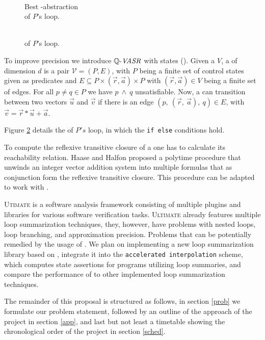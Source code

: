 \begin{minipage}[t]{0.35\linewidth} \centering
	\begin{figure}[H]
			
			\caption{\\ Best \qvasr-abstraction \\ of $P$'s loop.}
			\label{vasr}
	\end{figure}
\end{minipage}
\begin{minipage}[t]{0.3\linewidth} \centering
	\begin{figure}[H]
		
		\caption{\\ \qvasrs of $P$'s loop.}
		\label{vasrs}
	\end{figure}
\end{minipage}
\vspace*{1cm}

To improve precision we introduce $\mathit{\mathbb{Q} \text{-}VASR}$ with states (\qvasrs). Given a \qvasr $V$, a \qvasrs of dimension $d$ is a pair $\mathcal{V} = (P, E)$, with $P$ being a finite set of control states given as predicates and $E \subseteq P \times (\vec{r}, \vec{a}) \times P$ with $(\vec{r}, \vec{a}) \in V$ being a finite set of edges. For all $p \neq q \in P$ we have $p\ \land\ q$ unsatisfiable. Now, a \qvasrs can transition between two vectors $\vec{u}$ and $\vec{v}$ if there is an edge $(p,\ (\vec{r},\ \vec{a}),\ q) \in E$, with $\vec{v} = \vec{r} * \vec{u} + \vec{a}$. \par
Figure \ref{vasrs} details the \qvasrs of $P's$ loop, in which the \texttt{if else} conditions hold. \par
To compute the reflexive transitive closure of a \qvasrs one has to calculate its reachability relation. Haase and Halfon \cite{10.1007/978-3-319-11439-2_9} proposed a polytime procedure that unwinds an integer vector addition system into multiple formulas that as conjunction form the reflexive transitive closure. This procedure can be adapted to work with \qvasrs. \\ \par

\textsc{Utimate}\cite{Zitat02} is a software analysis framework consisting of multiple plugins and libraries for various software verification tasks. \textsc{Ultimate} already features multiple loop summarization techniques, they, however, have problems with nested loops, loop branching, and approximation precision. Problems that can be potentially remedied by the usage of \qvasrs. We plan on implementing a new loop summarization library based on \qvasrs, integrate it into the \texttt{accelerated interpolation} scheme, which computes state assertions for programs utilizing loop summaries, and compare the performance of \qvasrs to other implemented loop summarization techniques. \par
The remainder of this proposal is structured as follows, in section \ref{prob} we formulate our problem statement, followed by an outline of the approach of the project in section \ref{app}, and last but not least a timetable showing the chronological order of the project in section \ref{sched}.
